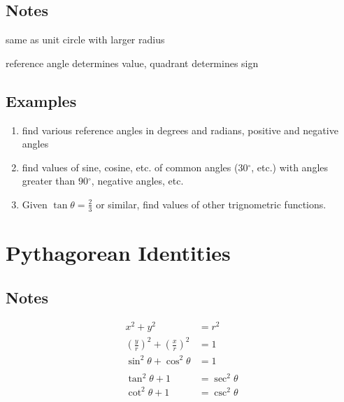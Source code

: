 \documentclass{exam}
\newcommand{\dg}{\ensuremath{^\circ}}
\begin{document}
  \subsection{Notes}
  \begin{itemize*}
    \item same as unit circle with larger radius
    \item reference angle determines value, quadrant determines sign
  \end{itemize*}

  \subsection{Examples}

  \begin{enumerate}
    \item find various reference angles in degrees and radians, positive and negative angles

    \item find values of sine, cosine, etc. of common angles ($30 \dg$, etc.)
      with angles greater than $90 \dg$, negative angles, etc.

    \item Given $\tan \theta = \frac{2}{3}$ or similar, find values of other trignometric functions.
  \end{enumerate}

  \section{Pythagorean Identities}

  \subsection{Notes}

  \begin{align*}
    x^2 + y^2                                                   & = r^2 \\
    \left( \frac{y}{r} \right)^2 + \left( \frac{x}{r} \right)^2 & = 1 \\
    \sin^2 \theta + \cos^2 \theta                               & = 1 \\
    \\
    \tan^2 \theta + 1 &= \sec^2 \theta \\
    \cot^2 \theta + 1 &= \csc^2 \theta \\
  \end{align*}
\end{document}
